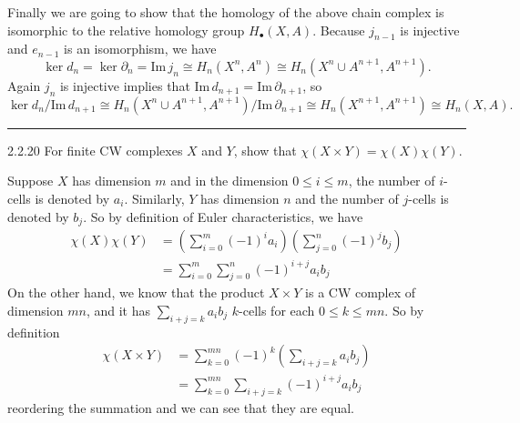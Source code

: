 \documentclass[a4paper, 12pt]{article}
\begin{document}
\begin{solution}
Finally we are going to show that the homology of the above chain complex is isomorphic to the relative homology group \(H_\bullet(X,A)\). Because \(j_{n-1}\) is injective and \(e_{n-1}\) is an isomorphism, we have 
\[\ker d_n=\ker \partial_n=\text{Im}\, j_n\cong H_n(X^n,A^n)\cong H_n(X^n\cup A^{n+1},A^{n+1}).\]
Again \(j_n\) is injective implies that \(\text{Im}\, d_{n+1}=\text{Im}\, \partial_{n+1}\), so 
\[\ker d_n/\text{Im}\, d_{n+1}\cong H_n(X^n\cup A^{n+1},A^{n+1})/\text{Im}\, \partial_{n+1}\cong H_n(X^{n+1},A^{n+1})\cong H_n(X,A).\]
\end{solution}

\noindent\rule{7in}{2.8pt}
\begin{problem}{2.2.20}
For finite CW complexes \(X\) and \(Y\), show that \(\chi(X\times Y)=\chi(X)\chi(Y)\).
\end{problem}
\begin{solution}
Suppose \(X\) has dimension \(m\) and in the dimension \(0\leq i\leq m\), the number of \(i\)-cells is denoted by \(a_i\). Similarly, \(Y\) has dimension \(n\) and the number of \(j\)-cells is denoted by \(b_j\). So by definition of Euler
characteristics, we have 
\begin{align*}
    \chi(X)\chi(Y)&=(\sum_{i=0}^{m} (-1)^i a_i)(\sum_{j=0}^{n}(-1)^j  b_j)\\ 
                  &=\sum_{i=0}^{m}\sum_{j=0}^{n}(-1)^{i+j} a_ib_j
\end{align*}
On the other hand, we know that the product \(X\times Y\) is a CW complex of dimension \(mn\), and it has \(\sum_{i+j=k} a_ib_j\) \(k\)-cells for each \(0\leq k\leq mn\). So by definition 
\begin{align*}
    \chi (X\times Y)&=\sum_{k=0}^{mn} (-1)^k (\sum_{i+j=k} a_ib_j)\\ 
                    &=\sum_{k=0}^{mn} \sum_{i+j=k} (-1)^{i+j} a_ib_j
\end{align*}
reordering the summation and we can see that they are equal.
\end{solution}
\end{document}

